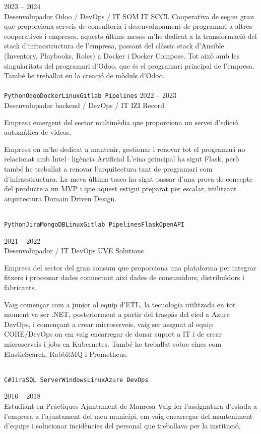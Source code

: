 \documentclass[9pt]{developercv} %
\begin{document}
\begin{entrylist}
	\entry
		{2023 -- 2024\\}
		{Desenvolupador Odoo / DevOps / IT}
		{SOM IT SCCL}
		{Cooperativa de segon grau que proporciona serveis de consultoria i desenvolupament de programari a altres cooperatives i empreses.
		aquests últims mesos m'he dedicat a la transformació del stack d'infraestructura de l'empresa, passant del clàssic stack d'Ansible (Inventory, Playbooks, Roles) a Docker i Docker Compose. Tot això amb les singularitats del programari d'Odoo, que és el programari principal de l'empresa. També he treballat en la creació de mòduls d'Odoo.\\
		\\ \texttt{Python}\slashsep\texttt{Odoo}\slashsep\texttt{Docker}\slashsep\texttt{Linux}\slashsep\texttt{Gitlab Pipelines}
		}
	\entry
		{2022 -- 2023\\}
		{Desenvolupador backend / DevOps / IT}
		{IZI Record}
		{Empresa emergent del sector multimèdia que proporciona un servei d'edició automàtica de vídeos.

		Empresa on m'he dedicat a mantenir, gestionar i renovar tot el programari no relacionat amb Intel·ligència Artificial  L'eina principal ha sigut Flask, però també he treballat a renovar
		l'arquitectura tant de programari com d'infraestructura. La meva última tasca ha sigut passar d'una prova de concepte del producte a un MVP i que aquest estigui preparat per escalar, utilitzant arquitectura Domain Driven Design.

		\\ \texttt{Python}\slashsep\texttt{Jira}\slashsep\texttt{MongoDB}\slashsep\texttt{Linux}\slashsep\texttt{Gitlab Pipelines}\slashsep\texttt{Flask}\slashsep\texttt{OpenAPI}}
	\entry
		{2021 -- 2022\\}
		{Desenvolupador / IT DevOps}
		{UVE Solutions}
		{Empresa del sector del gran consum que proporciona una plataforma per integrar fitxers i
		processar dades connectant així dades de consumidors, distribuïdors i fabricants.

		Vaig començar com a junior al equip d’ETL, la tecnologia utilitzada en tot moment va ser .NET, posteriorment a partir del traspás del cicd a Azure DevOps, i començant a crear microserveis, vaig ser
		assgnat al equip CORE/DevOps on em vaig encarregar de donar suport a IT i de crear microserveis
		i jobs en Kubernetes.
		També he treballat sobre eines com ElasticSearch, RabbitMQ i Prometheus.
		
		\\ \texttt{C\#}\slashsep\texttt{Jira}\slashsep\texttt{SQL Server}\slashsep\texttt{Windows}\slashsep\texttt{Linux}\slashsep\texttt{Azure DevOps}}

	\entry
		{2016 -- 2018\\}
		{Estudiant en Pràctiques}
		{Ajuntament de Manresa}
		{ 
			Vaig fer l'assignatura d'estada a l'empresa a l'ajuntament del meu municipi, em vaig encarregar del manteniment d'equips i solucionar incidències del personal que treballava per la institució. 
			}

\end{entrylist}
\end{document}
